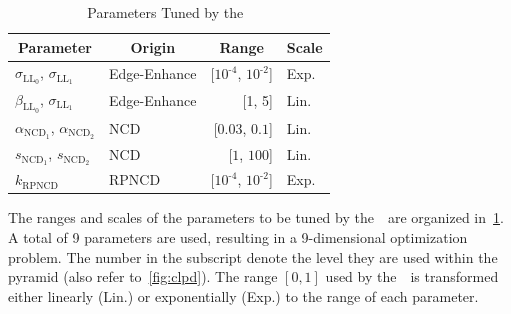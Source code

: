 \begin{table}
  \centering
  \caption{Parameters Tuned by the~\usdg}\label{table:params}
  \begin{threeparttable}
  \begin{tabular}{llrl}
    \toprule
    \multicolumn{1}{c}{\textbf{Parameter}}
    & \multicolumn{1}{c}{\textbf{Origin}}
    & \multicolumn{1}{c}{\textbf{Range}}
    & \multicolumn{1}{c}{\textbf{Scale}}
    \\ \midrule
    \(\sigma_{\mathrm{LL}_0}\), \(\sigma_{\mathrm{LL}_1}\)  & Edge-Enhance & [\(10^{\text{-}4}\), \(10^{\text{-}2}\)] & Exp.  \\
    \(\beta_{\mathrm{LL}_0}\), \(\sigma_{\mathrm{LL}_1}\)   & Edge-Enhance & [1, 5]                   & Lin. \\
    \(\alpha_{\mathrm{NCD}_1}\), \(\alpha_{\mathrm{NCD}_2}\) & NCD          & [\(0.03\), \(0.1\)]     & Lin.  \\
    \(s_{\mathrm{NCD}_1}\), \(s_{\mathrm{NCD}_2}\)           & NCD          & [\(1\), \(100\)]        & Lin. \\
    \(k_{\text{RPNCD}}\)                                & RPNCD        & [\(10^{\text{-}4}\), \(10^{\text{-}2}\)] & Exp. \\\bottomrule
  \end{tabular}
  \end{threeparttable}
\end{table}
%
The ranges and scales of the parameters to be tuned by the~\usdg~are organized in~\cref{table:params}.
A total of 9 parameters are used, resulting in a 9-dimensional optimization problem.
The number in the subscript denote the level they are used within the pyramid (also refer to~\cref{fig:clpd}).
The range \([0, 1]\) used by the~\usdg~is transformed either linearly (Lin.) or exponentially (Exp.) to the range of each parameter.


